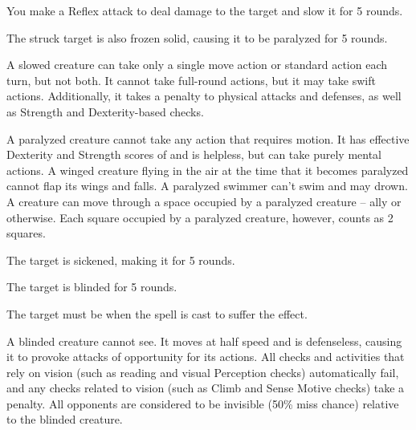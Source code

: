 \begin{spellhealthy}
    You make a Reflex attack to deal damage to the target and slow it for 5 rounds.
\end{spellhealthy}
\begin{spellblood}
    The struck target is also frozen solid, causing it to be paralyzed for 5 rounds.
\end{spellblood}
\begin{spellnotes}
    A slowed creature can take only a single move action or standard action each turn, but not both. It cannot take full-round actions, but it may take swift actions. Additionally, it takes a  penalty to physical attacks and defenses, as well as Strength and Dexterity-based checks.

    A paralyzed creature cannot take any action that requires motion. It has effective Dexterity and Strength scores of  and is helpless, but can take purely mental actions. A winged creature flying in the air at the time that it becomes paralyzed cannot flap its wings and falls. A paralyzed swimmer can't swim and may drown. A creature can move through a space occupied by a paralyzed creature -- ally or otherwise. Each square occupied by a paralyzed creature, however, counts as 2 squares.
\end{spellnotes}

\begin{spellhealthy}
    The target is sickened, making it \vulnerable for 5 rounds.
\end{spellhealthy}
\begin{spellblood}
    The target is blinded for 5 rounds.
\end{spellblood}
\begin{spellnotes}
    The target must be \bloodied when the spell is cast to suffer the \bloodied effect.

    A blinded creature cannot see. It moves at half speed and is defenseless, causing it to provoke attacks of opportunity for its actions. All checks and activities that rely on vision (such as reading and visual Perception checks) automatically fail, and any checks related to vision (such as Climb and Sense Motive checks) take a  penalty. All opponents are considered to be invisible (50\% miss chance) relative to the blinded creature.
\end{spellnotes}


